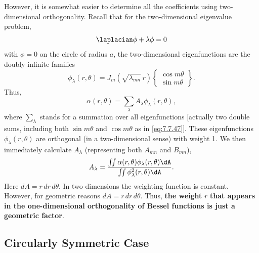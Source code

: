 However, it is somewhat easier to determine all the coefficients using two-dimensional orthogonality.  Recall that for the two-dimensional eigenvalue problem,
\[
\laplacian\phi + \lambda\phi = 0
\]
with $\phi = 0$ on the circle of radius $a$, the two-dimensional eigenfunctions are the doubly infinite families
\begin{equation}
\phi_\lambda(r,\theta) = J_m\left(\sqrt{\lambda_{mn}}\,r\right)
\begin{Bmatrix} \cos m\theta \\ \sin m\theta \end{Bmatrix}.
\label{eq:7.7.48a}
\end{equation}
Thus,
\begin{equation}
\alpha(r,\theta) = \sum_\lambda A_\lambda\phi_\lambda(r,\theta),
\label{eq:7.7.48}
\end{equation}
where $\sum_\lambda$ stands for a summation over all eigenfunctions [actually two double sums, including both $\sin m\theta$ and $\cos m\theta$ as in \eqref{eq:7.7.47}].  These eigenfunctions $\phi_\lambda(r,\theta)$ are orthogonal (in a two-dimensional sense) with weight 1.  We then immediately calculate $A_\lambda$ (representing both $A_{mn}$ and $B_{mn}$),
\begin{equation}
A_\lambda = \frac{\int\!\!\int\alpha(r,\theta)\phi_\lambda(r,\theta)\dA}{\int\!\!\int\phi_\lambda^2(r,\theta)\dA}.
\label{eq:7.7.49}
\end{equation}
Here $dA = r\,dr\,d\theta$.  In two dimensions the weighting function is constant.  However, for geometric reasons $dA = r\,dr\,d\theta$.  Thus, \textbf{the weight} $r$ \textbf{that appears in the one-dimensional orthogonality of Bessel functions is just a geometric factor}.

\subsection{Circularly Symmetric Case}
\label{sec:7.7.9}

